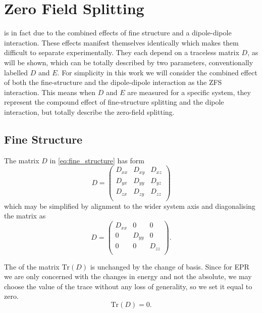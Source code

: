 \section{Zero Field Splitting}\label{zfs}
 is in fact due to the combined effects of fine structure and a dipole-dipole interaction. These effects manifest themselves identically which makes them difficult to separate experimentally. They each depend on a traceless matrix $D$, as will be shown, which can be totally described by two parameters, conventionally labelled $D$ and $E$. 
For simplicity in this work we will consider the combined effect of both the fine-structure and the dipole-dipole interaction as the ZFS interaction. This means when $D$ and $E$ are measured for a specific system, they represent the compound effect of fine-structure splitting and the dipole interaction, but totally describe the zero-field splitting. 

\subsection{Fine Structure}
The matrix $D$ in \eqref{eq:fine_structure} has form 
\begin{equation}
   D = \begin{pmatrix}
       D_{xx} & D_{xy} & D_{xz} \\ 
       D_{yx} & D_{yy} & D_{yz} \\ 
       D_{zx} & D_{zy} & D_{zz} \\ 
   \end{pmatrix} 
\end{equation}
which may be simplified by alignment to the wider system axis and diagonalising the matrix as 
\begin{equation}
   D = \begin{pmatrix}
       D_{xx} & 0 & 0 \\ 
       0 & D_{yy} & 0 \\ 
       0 & 0 & D_{zz} \\ 
   \end{pmatrix}.
    \label{eq:fine_splitting_D}
\end{equation}

The  of the matrix $\text{Tr}(D)$ is unchanged by the change of basis. Since for EPR we are only concerned with the changes in energy and not the absolute, we may choose the value of the trace without any loss of generality, so we set it equal to zero. 
\begin{equation}
    \text{Tr}(D) = 0. 
\end{equation}

